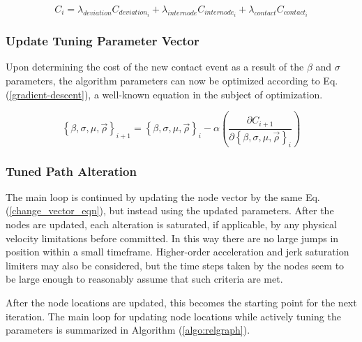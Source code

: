 \documentclass[conf]{new-aiaa}
\begin{document}
\begin{equation}
\label{total-cost}
C_i = \lambda_{deviation}C_{deviation_i} + \lambda_{internode}C_{internode_i} + \lambda_{contact}C_{contact_i}
\end{equation}


\subsubsection{Update Tuning Parameter Vector}
Upon determining the cost of the new contact event as a result of the $\beta$ and $\sigma$ parameters, the algorithm parameters can now be optimized according to Eq. (\ref{gradient-descent}),  a well-known equation in the subject of optimization.

\begin{equation}
\label{gradient-descent}
\left\{\beta, \sigma, \mu, \vec{\rho}\right\}_{i + 1} = \left\{\beta, \sigma, \mu, \vec{\rho}\right\}_i - \alpha\left(\frac{\partial{C_{i + 1}}}{\partial{\left\{\beta, \sigma, \mu, \vec{\rho}\right\}_i}}\right)
\end{equation}


\subsubsection{Tuned Path Alteration}
The main loop is continued by updating the node vector by the same Eq. (\ref{change_vector_eqn}), but instead using the updated parameters. After the nodes are updated, each alteration is saturated, if applicable, by any physical velocity limitations before committed. In this way there are no large jumps in position within a small timeframe. Higher-order acceleration and jerk saturation limiters may also be considered, but the time steps taken by the nodes seem to be large enough to reasonably assume that such criteria are met.

After the node locations are updated, this becomes the starting point for the next iteration. The main loop for updating node locations while actively tuning the parameters is summarized in Algorithm (\ref{algo:relgraph}).
\end{document}
